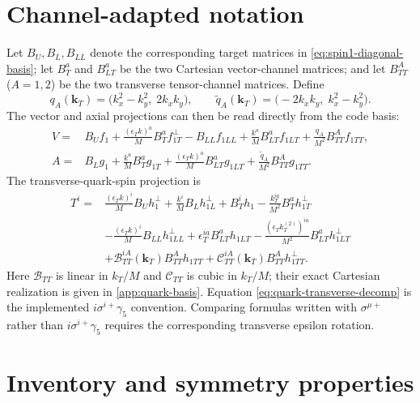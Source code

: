 \documentclass[11pt,oneside]{book}
\newcommand{\kT}{\bm{k}_{T}}
\begin{document}
\section{Channel-adapted notation}

Let $B_U,B_L,B_{LL}$ denote the corresponding target matrices in \cref{eq:spin1-diagonal-basis}; let $B_T^a$ and $B_{LT}^a$ be the two Cartesian vector-channel matrices; and let $B_{TT}^A$ ($A=1,2$) be the two transverse tensor-channel matrices.  Define
\begin{equation}
 q_A(\kT)=\bigl(k_x^2-k_y^2,\;2k_xk_y\bigr),
 \qquad
 \widetilde q_A(\kT)=\bigl(-2k_xk_y,\;k_x^2-k_y^2\bigr).
 \label{eq:tt-harmonic-components}
\end{equation}
The vector and axial projections can then be read directly from the code basis:
\begin{align}
 V={}&B_U f_1
 +\frac{(\epsilon_T k)^a}{M}B_T^a f_{1T}^{\perp}
 -B_{LL}f_{1LL}
 +\frac{k^a}{M}B_{LT}^a f_{1LT}
 +\frac{q_A}{M^2}B_{TT}^A f_{1TT},
 \label{eq:quark-vector-decomp}\\
 A={}&B_L g_1
 +\frac{k^a}{M}B_T^a g_{1T}
 +\frac{(\epsilon_Tk)^a}{M}B_{LT}^a g_{1LT}
 +\frac{\widetilde q_A}{M^2}B_{TT}^A g_{1TT}.
 \label{eq:quark-axial-decomp}
\end{align}
The transverse-quark-spin projection is
\begin{align}
 T^i={}&\frac{(\epsilon_Tk)^i}{M}B_U h_1^\perp
 +\frac{k^i}{M}B_L h_{1L}^\perp
 +B_T^i h_1
 -\frac{k_T^{ia}}{M^2}B_T^a h_{1T}^\perp
 \nonumber\\
 &-\frac{(\epsilon_Tk)^i}{M}B_{LL}h_{1LL}^\perp
 +\epsilon_T^{ia}B_{LT}^a h_{1LT}
 -\frac{(\epsilon_T k_T^{(2)})^{ia}}{M^2}B_{LT}^a h_{1LT}^\perp
 \nonumber\\
 &+\mathcal B_{TT}^{iA}(\kT)B_{TT}^A h_{1TT}
 +\mathcal C_{TT}^{iA}(\kT)B_{TT}^A h_{1TT}^\perp.
 \label{eq:quark-transverse-decomp}
\end{align}
Here $\mathcal B_{TT}$ is linear in $k_T/M$ and $\mathcal C_{TT}$ is cubic in $k_T/M$; their exact Cartesian realization is given in \cref{app:quark-basis}.  Equation \cref{eq:quark-transverse-decomp} is the implemented $i\sigma^{i+}\gamma_5$ convention.  Comparing formulas written with $\sigma^{\mu+}$ rather than $i\sigma^{i+}\gamma_5$ requires the corresponding transverse epsilon rotation.

\section{Inventory and symmetry properties}
\end{document}
